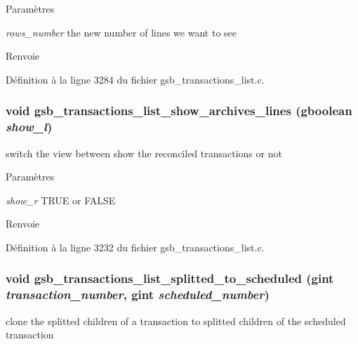 \begin{DoxyParams}{Paramètres}
\item[{\em rows\_\-number}]the new number of lines we want to see\end{DoxyParams}
\begin{DoxyReturn}{Renvoie}

\end{DoxyReturn}


Définition à la ligne 3284 du fichier gsb\_\-transactions\_\-list.c.

\subsubsection[{gsb\_\-transactions\_\-list\_\-show\_\-archives\_\-lines}]{\setlength{\rightskip}{0pt plus 5cm}void gsb\_\-transactions\_\-list\_\-show\_\-archives\_\-lines (gboolean {\em show\_\-l})}\label{gsb__transactions__list_8h_a7a066474fae8e311ca096b15cf9d33cc}
switch the view between show the reconciled transactions or not


\begin{DoxyParams}{Paramètres}
\item[{\em show\_\-r}]TRUE or FALSE\end{DoxyParams}
\begin{DoxyReturn}{Renvoie}

\end{DoxyReturn}


Définition à la ligne 3232 du fichier gsb\_\-transactions\_\-list.c.

\subsubsection[{gsb\_\-transactions\_\-list\_\-splitted\_\-to\_\-scheduled}]{\setlength{\rightskip}{0pt plus 5cm}void gsb\_\-transactions\_\-list\_\-splitted\_\-to\_\-scheduled (gint {\em transaction\_\-number}, \/  gint {\em scheduled\_\-number})}\label{gsb__transactions__list_8h_a0ea3d83f0d74d289b6ae23c495f4aa7d}
clone the splitted children of a transaction to splitted children of the scheduled transaction


